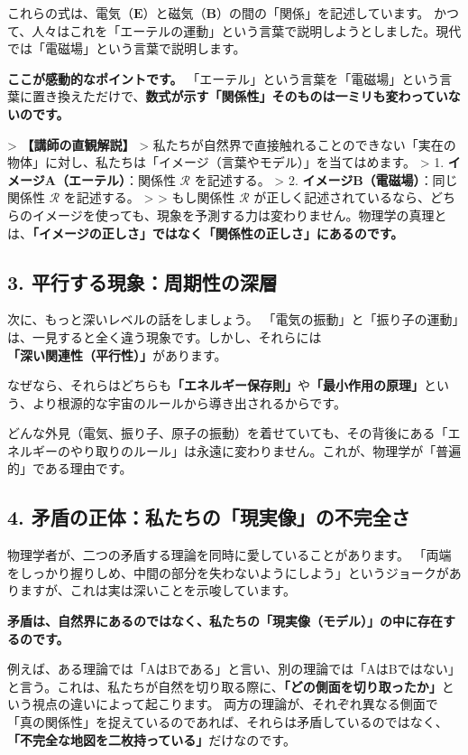 \documentclass[a4paper,11pt,openany]{ltjsbook}
\begin{document}
\begin{lecturebox}
これらの式は、電気（$\mathbf{E}$）と磁気（$\mathbf{B}$）の間の「関係」を記述しています。
かつて、人々はこれを「エーテルの運動」という言葉で説明しようとしました。現代では「電磁場」という言葉で説明します。

\textbf{ここが感動的なポイントです。}
「エーテル」という言葉を「電磁場」という言葉に置き換えただけで、\textbf{数式が示す「関係性」そのものは一ミリも変わっていないのです。}

> \textbf{【講師の直観解説】}
> 私たちが自然界で直接触れることのできない「実在の物体」に対し、私たちは「イメージ（言葉やモデル）」を当てはめます。
> 1. \textbf{イメージA（エーテル）}：関係性 $\mathcal{R}$ を記述する。
> 2. \textbf{イメージB（電磁場）}：同じ関係性 $\mathcal{R}$ を記述する。
>
> もし関係性 $\mathcal{R}$ が正しく記述されているなら、どちらのイメージを使っても、現象を予測する力は変わりません。物理学の真理とは、\textbf{「イメージの正しさ」ではなく「関係性の正しさ」にあるのです。}

\subsection*{3. 平行する現象：周期性の深層}

次に、もっと深いレベルの話をしましょう。
「電気の振動」と「振り子の運動」は、一見すると全く違う現象です。しかし、それらには\textbf{「深い関連性（平行性）」}があります。

なぜなら、それらはどちらも\textbf{「エネルギー保存則」}や\textbf{「最小作用の原理」}という、より根源的な宇宙のルールから導き出されるからです。

どんな外見（電気、振り子、原子の振動）を着せていても、その背後にある「エネルギーのやり取りのルール」は永遠に変わりません。これが、物理学が「普遍的」である理由です。

\subsection*{4. 矛盾の正体：私たちの「現実像」の不完全さ}

物理学者が、二つの矛盾する理論を同時に愛していることがあります。
「両端をしっかり握りしめ、中間の部分を失わないようにしよう」というジョークがありますが、これは実は深いことを示唆しています。

\textbf{矛盾は、自然界にあるのではなく、私たちの「現実像（モデル）」の中に存在するのです。}

例えば、ある理論では「AはBである」と言い、別の理論では「AはBではない」と言う。これは、私たちが自然を切り取る際に、\textbf{「どの側面を切り取ったか」}という視点の違いによって起こります。
両方の理論が、それぞれ異なる側面で「真の関係性」を捉えているのであれば、それらは矛盾しているのではなく、\textbf{「不完全な地図を二枚持っている」}だけなのです。


\end{lecturebox}
\end{document}
